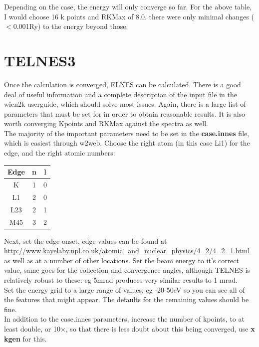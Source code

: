 \documentclass[12pt]{article}
\begin{document}
Depending on the case, the energy will only converge so far.  For the above table, I would choose 16 k points and RKMax of 8.0.  there were only minimal changes ($<$0.001Ry) to the energy beyond those. 

\section{TELNES3}

Once the calculation is converged, ELNES can be calculated.  There is a good deal of useful information and a complete description of the input file in the wien2k userguide, which should solve most issues. Again, there is a large list of parameters that must be set for in order to obtain reasonable results. It is also worth converging Kpoints and RKMax against the spectra as well.\\
The majority of the important parameters need to be set in the \textbf{case.innes} file, which is easiest through w2web.  Choose the right atom (in this case Li1) for the edge, and the right atomic numbers:  

\begin{table}[H]
	\centering
	\begin{tabular}{ccc}
		
		Edge & n & l \\
		\hline
		K & 1 &0 \\
		L1 & 2 & 0 \\
		L23 & 2 &1\\
		M45 & 3 & 2\\
	\end{tabular}
	
\end{table}

Next, set the edge onset, edge values can be found at \url{http://www.kayelaby.npl.co.uk/atomic_and_nuclear_physics/4_2/4_2_1.html} as well as at a number of other locations.  Set the beam energy to it's correct value, same goes for the collection and convergence angles, although TELNES is relatively robust to these: eg 5mrad produces very similar results to 1 mrad.\\

Set the energy grid to a large range of values, eg -20-50eV so you can see all of the features that might appear.  The defaults for the remaining values should be fine.\\

In addition to the case.innes parameters, increase the number of kpoints, to at least double, or 10$\times$, so that there is less doubt about this being converged, use \textbf{x kgen} for this.  \\
\end{document}
